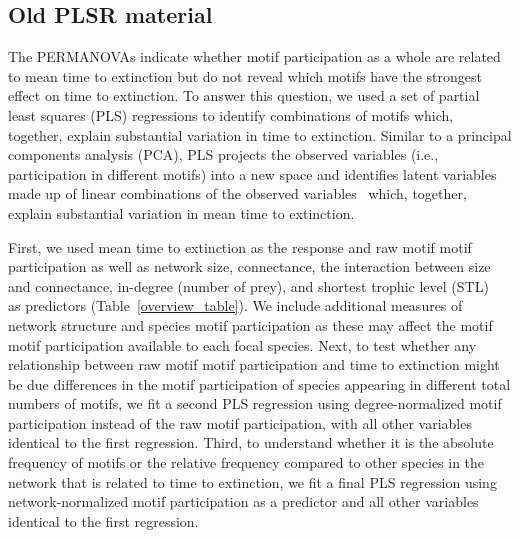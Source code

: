 \documentclass[12pt]{article}
\begin{document}
\begin{spacing}{2.0}
\clearpage













\section*{Old PLSR material}

	The PERMANOVAs indicate whether motif participation as a whole are related to mean time to extinction but do not reveal which motifs have the strongest effect on time to extinction.
	To answer this question, we used a set of partial least squares (PLS) regressions to identify combinations of motifs which, together, explain substantial variation in time to extinction. 
	Similar to a principal components analysis (PCA), PLS projects the observed variables (i.e., participation in different motifs) into a new space and identifies latent variables made up of linear combinations of the observed variables~\citep{Mevik2004,pls} which, together, explain substantial variation in mean time to extinction.
	
	
	First, we used mean time to extinction as the response and raw motif motif participation as well as network size, connectance, the interaction between size and connectance, in-degree (number of prey), and shortest trophic level (STL)~\citep{Hairston1993} as predictors (Table~\ref{overview_table}).
	We include additional measures of network structure and species motif participation as these may affect the motif motif participation available to each focal species.
	Next, to test whether any relationship between raw motif motif participation and time to extinction might be due differences in the motif participation of species appearing in different total numbers of motifs, we fit a second PLS regression using degree-normalized motif participation instead of the raw motif participation, with all other variables identical to the first regression.
	Third, to understand whether it is the absolute frequency of motifs or the relative frequency compared to other species in the network that is related to time to extinction, we fit a final PLS regression using network-normalized motif participation as a predictor and all other variables identical to the first regression.
	

\end{spacing}
\end{document}
